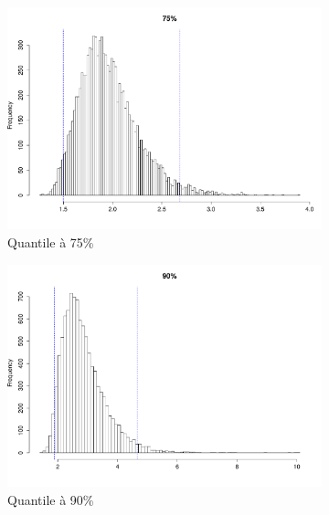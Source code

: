 \documentclass{article}
\renewcommand*{\(}{ \left( }
\renewcommand*{\)}{ \right) }
\begin{document}
\begin{figure}[H]
    \centering
    \begin{subfigure}[t]{0.3\textwidth}
        \includegraphics[width = \linewidth]{img/BootstrapParamEMV-75-100.pdf}
        \caption{Quantile à 75\%}
        \label{fig:BPEMV75b} %
    \end{subfigure}%
    \begin{subfigure}[t]{0.3\textwidth}
        \includegraphics[width = \linewidth]{img/BootstrapParamEMV-90-100.pdf}
        \caption{Quantile à 90\%}
        \label{fig:BPEMV90b}
    \end{subfigure}%
    \begin{subfigure}[t]{0.3\textwidth}

\end{subfigure}
\end{figure}
\end{document}
